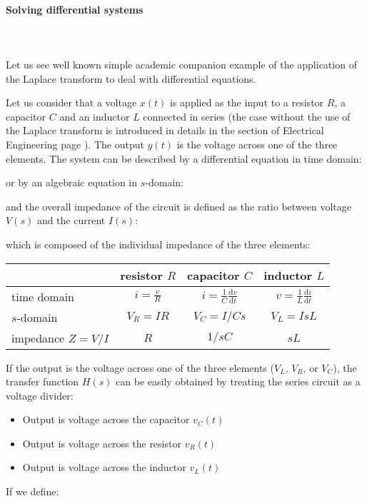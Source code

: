 	\paragraph{Solving differential systems}\mbox{}\\\\
	 Let us see well known simple academic companion example of the application of the Laplace transform to deal with differential equations.
	 
	 Let us consider that a voltage $x(t)$ is applied as the input to a resistor $R$, a capacitor $C$ and an inductor $L$ connected in series (the case without the use of the Laplace transform is introduced in details in the section of Electrical Engineering page \pageref{rlc circuit}). The output $y(t)$ is the voltage across one of the three elements. The system can be described by a differential equation in time domain:
	
	or by an algebraic equation in $s$-domain:
	
	and the overall impedance of the circuit is defined as the ratio between voltage $V(s)$ and the current $I(s)$:
	
	which is composed of the individual impedance of the three elements:
	

	\begin{table}[H]
		\centering
		\begin{tabular}{l|c|c|c} \hline
			& resistor $R$ & capacitor $C$ & inductor $L$  \\ \hline
		time domain & $i=\frac{v}{R}$ & $i=\frac{1}{C}\frac{\mathrm{d}v}{\mathrm{d}t}$ & $v=\frac{1}{L}\frac{\mathrm{d}i}{\mathrm{d}t}$ 
		\\ \hline 
		$s$-domain    & $V_R=IR$ & $V_C=I/Cs$ & $V_L=IsL$	\\ \hline
		impedance $Z=V/I$   &    $R$   &   $1/sC$   &   $sL$    \\ \hline
		\end{tabular}
	\end{table}	
	If the output is the voltage across one of the three elements ($V_L$, $V_R$, or $V_C$), the transfer function $H(s)$ can be easily obtained by treating the series circuit as a voltage divider: 
	\begin{itemize}
		\item Output is voltage across the capacitor $v_C(t)$
		
		\item Output is voltage across the resistor $v_R(t)$
		
		\item Output is voltage across the inductor $v_L(t)$
		
	\end{itemize}
	If we define:
	
